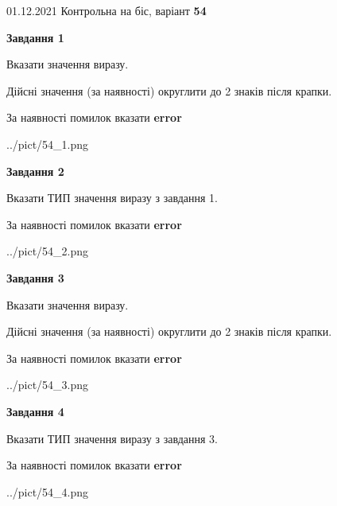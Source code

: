 \documentclass[11pt, ukrainian]{article}
\begin{document}
{01.12.2021 Контрольна на біс, варіант  \No \textbf { 54 }\par}
{
\begin {large}
{\begin {center}\textbf{Завдання 1}\end {center}}\par
Вказати значення виразу. \par
Дійсні значення (за наявності) округлити до 2 знаків після крапки. \par
За наявності помилок вказати \textbf{error}

\begin{center}
	{../pict/54_1.png}
\end{center}
\newpage

{\begin {center}\textbf{Завдання 2}\end {center}}\par
Вказати ТИП значення виразу з завдання 1. \par
За наявності помилок вказати \textbf{error}

\begin{center}
	{../pict/54_2.png}
\end{center}
\newpage

{\begin {center}\textbf{Завдання 3}\end {center}}\par
Вказати значення виразу. \par
Дійсні значення (за наявності) округлити до 2 знаків після крапки. \par
За наявності помилок вказати \textbf{error}

\begin{center}
	{../pict/54_3.png}
\end{center}
\newpage

{\begin {center}\textbf{Завдання 4}\end {center}}\par
Вказати ТИП значення виразу з завдання 3. \par
За наявності помилок вказати \textbf{error}

\begin{center}
	{../pict/54_4.png}
\end{center}
\newpage


\end{large}}
\end{document}
